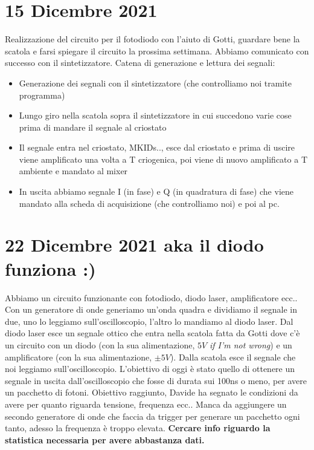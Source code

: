 \documentclass{article}
\numberwithin{equation}{section}
\begin{document}
\section{15 Dicembre 2021}
Realizzazione del circuito per il fotodiodo con l'aiuto di Gotti, guardare bene la scatola e farsi spiegare il circuito la prossima settimana.
Abbiamo comunicato con successo con il sintetizzatore.
Catena di generazione e lettura dei segnali:
\begin{itemize}
    \item Generazione dei segnali con il sintetizzatore (che controlliamo noi tramite programma)
    \item Lungo giro nella scatola sopra il sintetizzatore in cui succedono varie cose prima di mandare il segnale al criostato
    \item Il segnale entra nel criostato, MKIDs.., esce dal criostato e prima di uscire viene amplificato una volta a T criogenica, poi viene di nuovo amplificato a T ambiente e mandato al mixer \item In uscita abbiamo segnale I (in fase) e Q (in quadratura di fase) che viene mandato alla scheda di acquisizione (che controlliamo noi) e poi al pc.
\end{itemize}

\section{22 Dicembre 2021 aka il diodo funziona :)}
Abbiamo un circuito funzionante con fotodiodo, diodo laser, amplificatore ecc..
Con un generatore di onde generiamo un'onda quadra e dividiamo il segnale in due, uno lo leggiamo sull'oscilloscopio, l'altro lo mandiamo al diodo laser. Dal diodo laser esce un segnale ottico che entra nella scatola fatta da Gotti dove c'è un circuito con un diodo (con la sua alimentazione, $5V$ \textit{if I'm not wrong}) e un amplificatore (con la sua alimentazione, $\pm 5V$). Dalla scatola esce il segnale che noi leggiamo sull'oscilloscopio.
L'obiettivo di oggi è stato quello di ottenere un segnale in uscita dall'oscilloscopio che fosse di durata sui 100ns o meno, per avere un pacchetto di fotoni.
Obiettivo raggiunto, Davide ha segnato le condizioni da avere per quanto riguarda tensione, frequenza ecc..
Manca da aggiungere un secondo generatore di onde che faccia da trigger per generare un pacchetto ogni tanto, adesso la frequenza è troppo elevata.
\textbf{Cercare info riguardo la statistica necessaria per avere abbastanza dati.}
\end{document}
